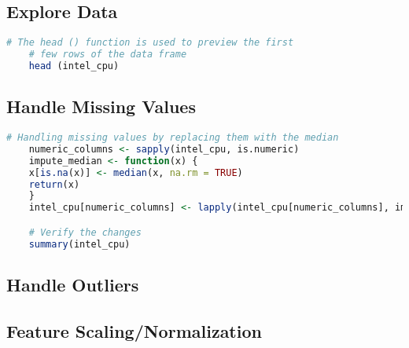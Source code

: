 \subsection{Explore Data}
\begin{lstlisting}[language=R]
    # The head () function is used to preview the first 
    # few rows of the data frame
    head (intel_cpu)
\end{lstlisting}

\subsection{Handle Missing Values}
\begin{lstlisting}[language=R]
    # Handling missing values by replacing them with the median
    numeric_columns <- sapply(intel_cpu, is.numeric)
    impute_median <- function(x) {
    x[is.na(x)] <- median(x, na.rm = TRUE)
    return(x)
    }
    intel_cpu[numeric_columns] <- lapply(intel_cpu[numeric_columns], impute_median)

    # Verify the changes
    summary(intel_cpu)
\end{lstlisting}


\subsection{Handle Outliers}

\subsection{Feature Scaling/Normalization}

\newpage